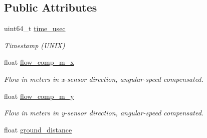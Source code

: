 \subsection*{Public Attributes}
\begin{DoxyCompactItemize}
\item 
\hypertarget{struct____mavlink__optical__flow__t_a01f76c236ab67155fe7770f82eb86ad6}{uint64\+\_\+t \hyperlink{struct____mavlink__optical__flow__t_a01f76c236ab67155fe7770f82eb86ad6}{time\+\_\+usec}}\label{struct____mavlink__optical__flow__t_a01f76c236ab67155fe7770f82eb86ad6}

\begin{DoxyCompactList}\small\item\em Timestamp (U\+N\+I\+X) \end{DoxyCompactList}\item 
\hypertarget{struct____mavlink__optical__flow__t_ab8fab603e276328627e4d96cc4f8b086}{float \hyperlink{struct____mavlink__optical__flow__t_ab8fab603e276328627e4d96cc4f8b086}{flow\+\_\+comp\+\_\+m\+\_\+x}}\label{struct____mavlink__optical__flow__t_ab8fab603e276328627e4d96cc4f8b086}

\begin{DoxyCompactList}\small\item\em Flow in meters in x-\/sensor direction, angular-\/speed compensated. \end{DoxyCompactList}\item 
\hypertarget{struct____mavlink__optical__flow__t_a2e39bcd7b74a5c660d1684c8e44e2cca}{float \hyperlink{struct____mavlink__optical__flow__t_a2e39bcd7b74a5c660d1684c8e44e2cca}{flow\+\_\+comp\+\_\+m\+\_\+y}}\label{struct____mavlink__optical__flow__t_a2e39bcd7b74a5c660d1684c8e44e2cca}

\begin{DoxyCompactList}\small\item\em Flow in meters in y-\/sensor direction, angular-\/speed compensated. \end{DoxyCompactList}\item 
\hypertarget{struct____mavlink__optical__flow__t_a89b39010e211494ffecc65c29fdd8c0e}{float \hyperlink{struct____mavlink__optical__flow__t_a89b39010e211494ffecc65c29fdd8c0e}{ground\+\_\+distance}}\label{struct____mavlink__optical__flow__t_a89b39010e211494ffecc65c29fdd8c0e}


\end{DoxyCompactItemize}
